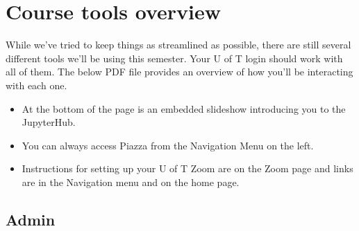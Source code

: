 \documentclass[
  openany]{book}
\providecommand{\tightlist}{%
  \setlength{\itemsep}{0pt}\setlength{\parskip}{0pt}}
\begin{document}
\hypertarget{course-tools-overview}{%
\section{Course tools overview}\label{course-tools-overview}}

While we've tried to keep things as streamlined as possible, there are still several different tools we'll be using this semester. Your U of T login should work with all of them. The below PDF file provides an overview of how you'll be interacting with each one.

\begin{itemize}
\tightlist
\item
  At the bottom of the page is an embedded slideshow introducing you to the JupyterHub.\\
\item
  You can always access Piazza from the Navigation Menu on the left.\\
\item
  Instructions for setting up your U of T Zoom are on the Zoom page and links are in the Navigation menu and on the home page.
\end{itemize}

\hypertarget{admin}{%
\subsection{Admin}\label{admin}}
\end{document}
